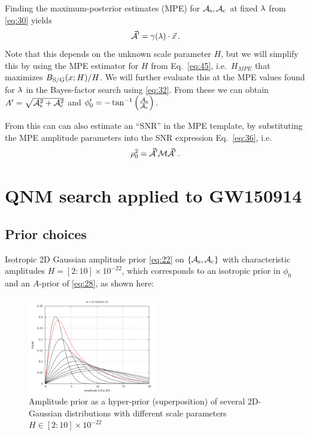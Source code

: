 \documentclass[aps,prd,onecolumn,notitlepage,nofootinbib,superscriptaddress,altaffilletter,floatfix]{revtex4-1}
\begin{document}
Finding the maximum-posterior estimates (MPE) for $\mathcal{A}_{\mathrm{s}},\mathcal{A}_{\mathrm{c}}$ at fixed $\lambda$ from \eqref{eq:30} yields
\begin{equation}
  \label{eq:31}
  \vec{\mathcal{A}}' = \gamma(\lambda)\cdot\vec{x}\,.
\end{equation}
Note that this depends on the unknown scale parameter $H$, but we will simplify this by using the MPE estimator for $H$ from Eq.~\eqref{eq:45}, i.e.\
$H_{MPE}$ that maximizes  $B_{\mathrm{S/G}}(x;H) / H$.
We will further evaluate this at the MPE values found for $\lambda$ in the Bayes-factor search using \eqref{eq:32}.
From these we can obtain $A' = \sqrt{\mathcal{A}_{\mathrm{s}}^2+\mathcal{A}_{\mathrm{c}}^2}$ and $\phi_0' = - \tan^{-1}\left(\frac{\mathcal{A}_{\mathrm{s}}}{\mathcal{A}_{\mathrm{c}}}\right)$.

From this can can also estimate an ``SNR'' in the MPE template, by substituting the MPE amplitude parameters into the SNR expression
Eq.~\eqref{eq:36}, i.e.\
\begin{equation}
  \label{eq:20}
  \rho_0^2 = \vec{\mathcal{A}}'\mathcal{M}\vec{\mathcal{A}}'\,.
\end{equation}

\section{QNM search applied to GW150914}
\label{sec:qnm-search-applied}

\subsection{Prior choices}
\label{sec:prior-choices}

Isotropic 2D Gaussian amplitude prior \eqref{eq:22} on $\{\mathcal{A}_{\mathrm{s}},\mathcal{A}_{\mathrm{c}}\}$ with characteristic amplitudes $H = [2 : 10]\times10^{-22}$, which corresponds to
an isotropic prior in $\phi_0$ and an $A$-prior of \eqref{eq:28}, as shown here:
\begin{figure}[htbp]
  \centering
  \includegraphics[width=0.5\textwidth]{prior_A.pdf}
  \caption{Amplitude prior as a hyper-prior (superposition) of several 2D-Gaussian distributions with different scale parameters $H\in{[2:10]}\times10^{-22}$}
  \label{fig:AmpPrior}
\end{figure}
\end{document}
